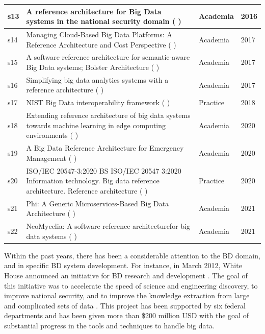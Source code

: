 \documentclass{ieeeaccess}
\begin{document}
\begin{table}
\begin{tabular}{|p{0.4cm}|p{14.3cm}|p{1.2cm}|p{0.5cm}|}
    s13 & A reference architecture for Big Data systems in the national security domain (\cite{Klein} ) & Academia  &  2016   \\
    \hline
    s14 & Managing Cloud-Based Big Data Platforms: A Reference Architecture and Cost Perspective (\cite{heilig2017managing} ) & Academia  &  2017   \\
    \hline
    s15 & A software reference architecture for semantic-aware Big Data systems; Bolster Architecture (\cite{Nadal} ) & Academia  &  2017   \\
    \hline
    s16 & Simplifying big data analytics systems with a reference architecture (\cite{sang2017simplifying} ) & Academia  &  2017   \\
    \hline
    s17 & NIST Big Data interoperability framework (\cite{Chang} ) & Practice  &  2018  \\
    \hline
    s18 & Extending reference architecture of big data systems towards machine learning in edge computing environments (\cite{paakkonen2020extending} )  & Academia & 2020   \\
    \hline
    s19 & A Big Data Reference Architecture for Emergency Management (\cite{iglesias2020big} )  & Academia & 2020   \\
    \hline
    s20 & ISO/IEC 20547-3:2020 BS ISO/IEC 20547 3:2020 Information technology. Big data reference architecture. Reference architecture (\cite{ISO20547} ) & Practice  &  2020  \\
    \hline
    s21 & Phi: A Generic Microservices-Based Big Data Architecture (\cite{maamouri2021phi} )  & Academia & 2021   \\
    \hline
    s22 & NeoMycelia: A software reference architecturefor big data systems (\cite{AtaeiApsec} )  & Academia & 2021   \\
    \hline
    \end{tabular}
\end{table}

Within the past years, there has been a considerable attention to the BD domain, and in specific BD system development. For instance, in March 2012, White House announced an initiative for BD research and development \cite{House}. The goal of this initiative was to accelerate the speed of science and engineering discovery, to improve national security, and to improve the knowledge extraction from large and complicated sets of data \cite{chang2015nist}. This project has been supported by six federal departments and has been given more than \$200 million USD with the goal of substantial progress in the tools and techniques to handle big data.
\end{document}
